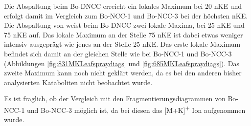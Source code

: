 Die  Abspaltung beim Bo-DNCC erreicht ein lokales Maximum bei 20 \gls{nKE} und erfolgt damit im Vergleich zum Bo-NCC-1 und Bo-NCC-3 bei der höchsten \gls{nKE}. Die Abspaltung von  weist beim Bo-DNCC zwei lokale Maxima, bei 25 \gls{nKE} und 75 \gls{nKE} auf. Das lokale Maximum an der Stelle 75 \gls{nKE} ist dabei etwas weniger intensiv ausgeprägt wie jenes an der Stelle 25 \gls{nKE}. Das erste lokale Maximum befindet sich damit an der gleichen Stelle wie bei Bo-NCC-1 und Bo-NCC-3 (Abbildungen \ref{fig:831MKLeafspraydiags} und \ref{fig:685MKLeafspraydiags}). Das zweite Maximum kann noch nicht geklärt werden, da es bei den anderen bisher analysierten Kataboliten nicht beobachtet wurde.

Es ist fraglich, ob der Vergleich mit den Fragmentierungsdiagrammen von Bo-NCC-1 und Bo-NCC-3 möglich ist, da bei diesen das [M+K]\textsuperscript{+} Ion aufgenommen wurde.
